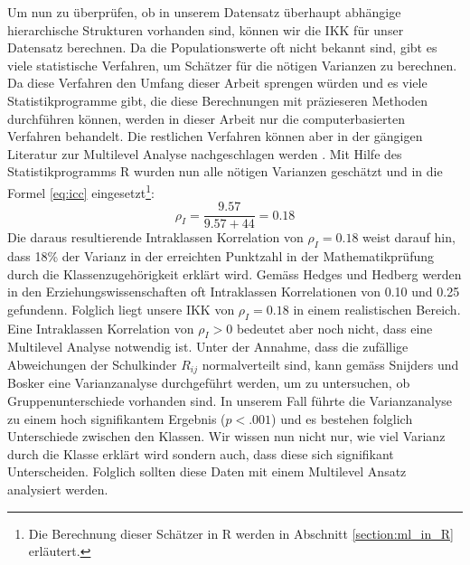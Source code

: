 \documentclass[12pt]{article}\usepackage[]{graphicx}\usepackage[]{color}
\begin{document}
Um nun zu überprüfen, ob in unserem Datensatz überhaupt abhängige hierarchische Strukturen vorhanden sind, können wir die IKK für unser Datensatz berechnen. Da die Populationswerte oft nicht bekannt sind, gibt es viele statistische Verfahren, um Schätzer für die nötigen Varianzen zu berechnen. Da diese Verfahren den Umfang dieser Arbeit sprengen würden und es viele Statistikprogramme gibt, die diese Berechnungen mit präzieseren Methoden durchführen können, werden in dieser Arbeit nur die computerbasierten Verfahren behandelt. Die restlichen Verfahren können aber in der gängigen Literatur zur Multilevel Analyse nachgeschlagen werden \citep[z.B.][]{SnijdersTomA.B2012Ma:a}. Mit Hilfe des Statistikprogramms R wurden nun alle nötigen Varianzen geschätzt und in die Formel \eqref{eq:icc} eingesetzt\footnote{Die Berechnung dieser Schätzer in R werden in Abschnitt \ref{section:ml_in_R} erläutert.}:
\begin{equation} \label{eq:icc_calc}
\rho_{I} = \dfrac{9.57}{9.57 + 44} = 0.18
\end{equation}
Die daraus resultierende Intraklassen Korrelation von $\rho_{I} = 0.18$ weist darauf hin, dass 18\% der Varianz in der erreichten Punktzahl in der Mathematikprüfung durch die Klassenzugehörigkeit erklärt wird. Gemäss Hedges und Hedberg \citeyearpar{hedges&hedberg:2007} werden in den Erziehungswissenschaften oft Intraklassen Korrelationen von 0.10 und 0.25 gefundenn. Folglich liegt unsere IKK von $\rho_{I} = 0.18$ in einem realistischen Bereich. Eine Intraklassen Korrelation von $\rho_{I} > 0$ bedeutet aber noch nicht, dass eine Multilevel Analyse notwendig ist. Unter der Annahme, dass die zufällige Abweichungen der Schulkinder $R_{ij}$ normalverteilt sind, kann gemäss Snijders und Bosker \citeyearpar{SnijdersTomA.B2012Ma:a} eine Varianzanalyse durchgeführt werden, um zu untersuchen, ob Gruppenunterschiede vorhanden sind. In unserem Fall führte die Varianzanalyse zu einem hoch signifikantem Ergebnis ($p<.001$) und es bestehen folglich Unterschiede zwischen den Klassen. Wir wissen nun nicht nur, wie viel Varianz durch die Klasse erklärt wird sondern auch, dass diese sich signifikant Unterscheiden. Folglich sollten diese Daten mit einem Multilevel Ansatz analysiert werden.
\end{document}
